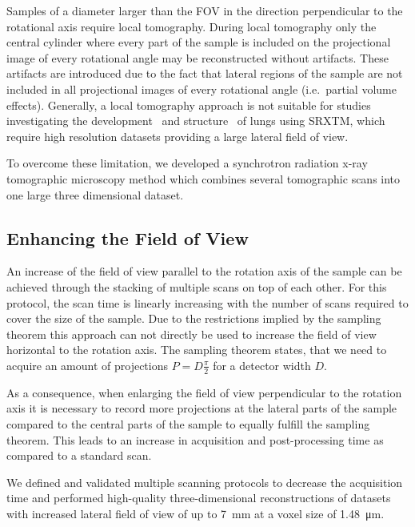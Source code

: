 Samples of a diameter larger than the FOV in the direction perpendicular to the rotational axis require local tomography. During local tomography only the central cylinder where every part of the sample is included on the projectional image of every rotational angle may be reconstructed without artifacts. These artifacts are introduced due to the fact that lateral regions of the sample are not included in all projectional images of every rotational angle (i.e.\ partial volume effects). Generally, a local tomography approach is not suitable for studies investigating the development~\cite{Schittny2008,Mund2008} and structure~\cite{Tsuda2008} of lungs using SRXTM, which require high resolution datasets providing a large lateral field of view.

To overcome these limitation, we developed a synchrotron radiation x-ray tomographic microscopy method which combines several tomographic scans into one large three dimensional dataset.

\subsection{Enhancing the Field of View}\label{subsec:enhancing the field of view}%
An increase of the field of view parallel to the rotation axis of the sample can be achieved through the stacking of multiple scans on top of each other. For this protocol, the scan time is linearly increasing with the number of scans required to cover the size of the sample. Due to the restrictions implied by the sampling theorem this approach can not directly be used to increase the field of view horizontal to the rotation axis. The sampling theorem states, that we need to acquire an amount of projections $P=D\frac{\pi}{2}$ for a detector width $D$.

As a consequence, when enlarging the field of view perpendicular to the rotation axis it is necessary to record more projections at the lateral parts of the sample compared to the central parts of the sample to equally fulfill the sampling theorem. This leads to an increase in acquisition and post-processing time as compared to a standard scan.

We defined and validated multiple scanning protocols to decrease the acquisition time and performed high-quality three-dimensional reconstructions of datasets with increased lateral field of view of up to \SI{7}{\milli\meter} at a voxel size of \SI{1.48}{\micro\meter}.